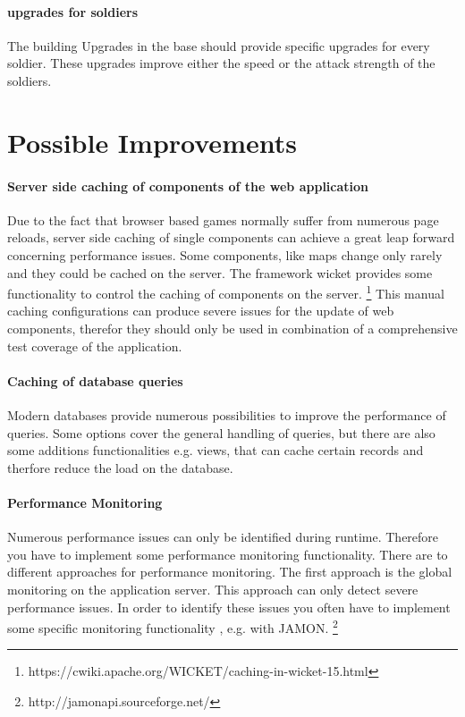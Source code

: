 \documentclass[a4paper]{article}
\begin{document}
\paragraph{upgrades for soldiers}
The building Upgrades in the base should provide specific upgrades for every soldier. These upgrades improve either the speed or the attack strength of the soldiers.

\section{Possible Improvements}
\paragraph{Server side caching of components of the web application}
Due to the fact that browser based games normally suffer from numerous page reloads, server side caching of single components can achieve a great leap forward concerning performance issues. Some components, like maps change only rarely and they could be cached on the server. The framework wicket provides some functionality to control the caching of components on the server. \footnote{https://cwiki.apache.org/WICKET/caching-in-wicket-15.html} This manual caching configurations can produce severe issues for the update of web components, therefor they should only be used in combination of a comprehensive test coverage of the application.

\paragraph{Caching of database queries}
Modern databases provide numerous possibilities to improve the performance of queries. Some options cover the general handling of queries, but there are also some additions functionalities e.g. views, that can cache certain records and therfore reduce the load on the database.

\paragraph{Performance Monitoring}
Numerous performance issues can only be identified during runtime. Therefore you have to implement some performance monitoring functionality. There are to different approaches for performance monitoring. The first approach is the global monitoring on the application server. This approach can only detect severe performance issues. In order to identify these issues you often have to implement some specific monitoring functionality , e.g. with JAMON. \footnote{http://jamonapi.sourceforge.net/}
\end{document}
